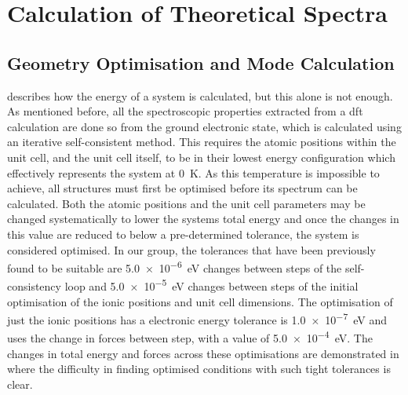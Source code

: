 \section{Calculation of Theoretical Spectra}
\subsection{Geometry Optimisation and Mode Calculation}
\label{subsec:GODMCalc}
 describes how the energy of a system is calculated, but this alone is not enough. As mentioned before, all the spectroscopic properties extracted from a \acrshort{dft} calculation are done so from the ground electronic state, which is calculated using an iterative self\nobreakdash-consistent method. This requires the atomic positions within the unit cell, and the unit cell itself, to be in their lowest energy configuration which effectively represents the system at \SI{0}{K}. As this temperature is impossible to achieve, all structures must first be optimised before its spectrum can be calculated. Both the atomic positions and the unit cell parameters may be changed systematically to lower the systems total energy and once the changes in this value are reduced to below a pre-determined tolerance, the system is considered optimised. In our group, the tolerances that have been previously found to be suitable \cite{Kendrick2020} are \SI{5.0e-6}{eV} changes between steps of the self\nobreakdash-consistency loop and \SI{5.0e-5}{eV} changes between steps of the initial optimisation of the ionic positions and unit cell dimensions. The optimisation of just the ionic positions has a electronic energy tolerance is \SI{1.0e-7}{eV} and uses the change in forces between step, with a value of \SI{5.0e-4}{eV}. The changes in total energy and forces across these optimisations are demonstrated in  where the difficulty in finding optimised conditions with such tight tolerances is clear.

